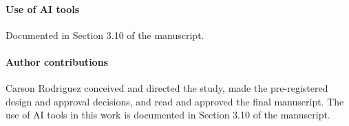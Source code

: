\documentclass[smallextended]{svjour3}
\begin{document}
\paragraph{Use of AI tools} Documented in Section 3.10 of the manuscript.

\paragraph{Author contributions} Carson Rodriguez conceived and directed the study, made the pre-registered design and approval decisions, and read and approved the final manuscript. The use of AI tools in this work is documented in Section 3.10 of the manuscript.
\end{document}
